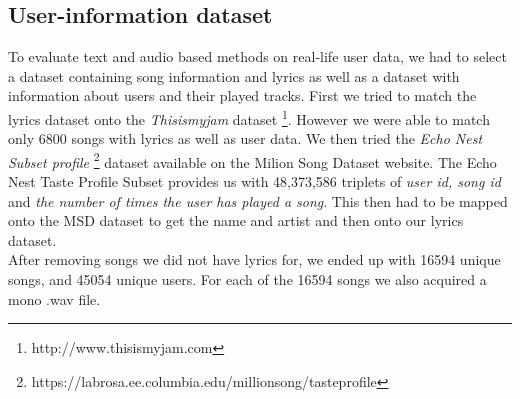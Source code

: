 \subsection{User-information dataset}
To evaluate text and audio based methods on real-life user data, we had to select a
dataset containing song information and lyrics as well as a dataset with information
about users and their played tracks. First we tried to match the lyrics dataset onto
the \textit{Thisismyjam} dataset \footnote{http://www.thisismyjam.com}. However we
were able to match only 6800 songs with lyrics as well as user data. We then tried
the \textit{Echo Nest Subset profile} \cite{Bertin-Mahieux2011}
\footnote{https://labrosa.ee.columbia.edu/millionsong/tasteprofile} dataset available
on the Milion Song Dataset website. 
The Echo Nest Taste Profile Subset provides us with 48,373,586 triplets of
\textit{user id, song id} and \textit{the number of times the user has played a
song}. This then had to be mapped onto the MSD dataset to get the name and artist and
then onto our lyrics dataset.\\
After removing songs we did not have lyrics for, we ended up with 16594 unique songs,
and 45054 unique users.  For each of the 16594 songs we also acquired a mono .wav
file. \\

